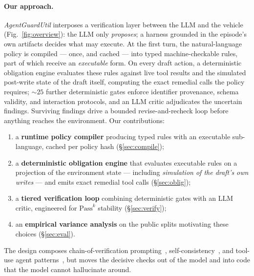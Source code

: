 \documentclass{article}
\newcommand{\pass}[1]{\ensuremath{\mathrm{Pass}^{#1}}}
\begin{document}
\paragraph{Our approach.}
\emph{AgentGuardUtil} interposes a verification layer between the LLM and the
vehicle (Fig.~\ref{fig:overview}): the LLM only \emph{proposes}; a harness
grounded in the episode's own artifacts decides what may execute. At the
first turn, the natural-language policy is compiled --- once, and cached ---
into typed machine-checkable rules, part of which receive an
\emph{executable} form. On every draft action, a deterministic obligation
engine evaluates these rules against live tool results and the simulated
post-write state of the draft itself, computing the exact remedial calls the
policy requires; ${\sim}25$ further deterministic gates enforce identifier
provenance, schema validity, and interaction protocols, and an LLM critic
adjudicates the uncertain findings. Surviving findings drive a bounded
revise-and-recheck loop before anything reaches the environment. Our
contributions:
\begin{enumerate}
\itemsep0pt
\item a \textbf{runtime policy compiler} producing typed rules with an
executable sub-language, cached per policy hash (\S\ref{sec:compile});
\item a \textbf{deterministic obligation engine} that evaluates executable
rules on a projection of the environment state --- including \emph{simulation
of the draft's own writes} --- and emits exact remedial tool calls
(\S\ref{sec:oblig});
\item a \textbf{tiered verification loop} combining deterministic gates with
an LLM critic, engineered for $\pass{k}$ stability (\S\ref{sec:verify});
\item an \textbf{empirical variance analysis} on the public splits motivating
these choices (\S\ref{sec:eval}).
\end{enumerate}
The design composes chain-of-verification
prompting~\cite{dhuliawala2023cove}, self-consistency~\cite{wang2023sc}, and
tool-use agent patterns~\cite{yao2023react,yao2024tau}, but moves the
decisive checks out of the model and into code that the model cannot
hallucinate around.
\end{document}
